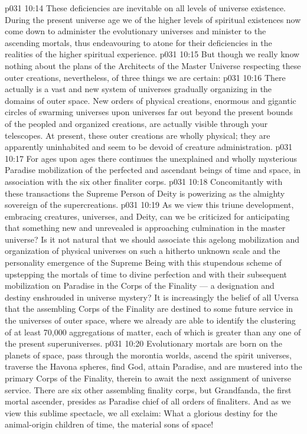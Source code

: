 \vs p031 10:14 These deficiencies are inevitable on all levels of universe existence. During the present universe age we of the higher levels of spiritual existences now come down to administer the evolutionary universes and minister to the ascending mortals, thus endeavouring to atone for their deficiencies in the realities of the higher spiritual experience.
\vs p031 10:15 But though we really know nothing about the plans of the Architects of the Master Universe respecting these outer creations, nevertheless, of three things we are certain:
\vs p031 10:16 \bibnobreakspace There actually is a vast and new system of universes gradually organizing in the domains of outer space. New orders of physical creations, enormous and gigantic circles of swarming universes upon universes far out beyond the present bounds of the peopled and organized creations, are actually visible through your telescopes. At present, these outer creations are wholly physical; they are apparently uninhabited and seem to be devoid of creature administration.
\vs p031 10:17 \bibnobreakspace For ages upon ages there continues the unexplained and wholly mysterious Paradise mobilization of the perfected and ascendant beings of time and space, in association with the six other finaliter corps.
\vs p031 10:18 \bibnobreakspace Concomitantly with these transactions the Supreme Person of Deity is powerizing as the almighty sovereign of the supercreations.
\vs p031 10:19 \pc As we view this triune development, embracing creatures, universes, and Deity, can we be criticized for anticipating that something new and unrevealed is approaching culmination in the master universe? Is it not natural that we should associate this agelong mobilization and organization of physical universes on such a hitherto unknown scale and the personality emergence of the Supreme Being with this stupendous scheme of upstepping the mortals of time to divine perfection and with their subsequent mobilization on Paradise in the Corps of the Finality --- a designation and destiny enshrouded in universe mystery? It is increasingly the belief of all Uversa that the assembling Corps of the Finality are destined to some future service in the universes of outer space, where we already are able to identify the clustering of at least 70,000 aggregations of matter, each of which is greater than any one of the present superuniverses.
\vs p031 10:20 \pc Evolutionary mortals are born on the planets of space, pass through the morontia worlds, ascend the spirit universes, traverse the Havona spheres, find God, attain Paradise, and are mustered into the primary Corps of the Finality, therein to await the next assignment of universe service. There are six other assembling finality corps, but Grandfanda, the first mortal ascender, presides as Paradise chief of all orders of finaliters. And as we view this sublime spectacle, we all exclaim: What a glorious destiny for the animal\hyp{}origin children of time, the material sons of space!
